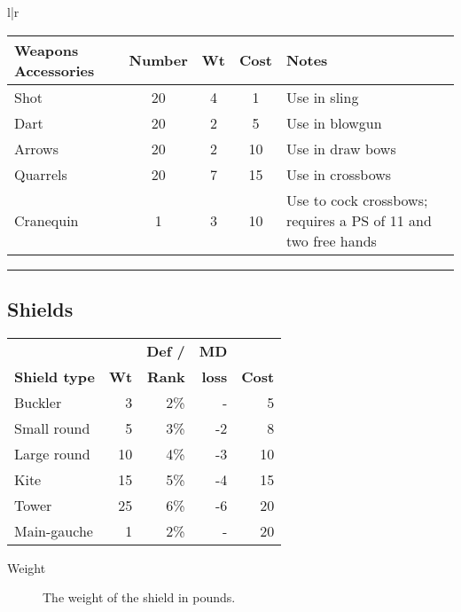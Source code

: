 \newpage

\begin{tabular}[t]{l|r}
\begin{minipage}[t]{4.6in}
\renewcommand{\thefootnote}{\Alph{footnote}}
\begin{tabularx}{\linewidth}[t]{lcccX}
\textbf{Weapons Accessories}\footnotemark & \tiny\textbf{Number} &
\tiny\textbf{Wt} & \tiny\textbf{Cost} & \tiny\textbf{Notes} \\ \hline
Shot		& 20 & 4 & 1 & Use in sling \\ \hline
Dart		& 20 & 2 & 5 & Use in blowgun \\ \hline
Arrows		& 20 & 2 & 10 & Use in draw bows \\ \hline
Quarrels	& 20 & 7 & 15 & Use in crossbows \\ \hline
Cranequin	& 1 & 3 & 10 & Use to cock crossbows; requires a PS of
11 and two free hands \\
\end{tabularx}

\smallskip

\rule[2.0mm]{\linewidth}{1.0mm}

\subsection{Shields}
\label{tables:shields}

\begin{tabularx}{\linewidth}{Xrrrr}
	 	&	& \textbf{Def /} & \textbf{MD} &  \\
\textbf{Shield type} & \textbf{Wt} & \textbf{Rank} &
\textbf{loss} & \textbf{Cost} \\ \hline
Buckler		& 3	& 2\%	& -	& 5 \\ \hline
Small round	& 5	& 3\%	& -2	& 8 \\ \hline
Large round	& 10	& 4\%	& -3	& 10 \\ \hline
Kite		& 15	& 5\%	& -4	& 15 \\ \hline
Tower		& 25	& 6\%	& -6	& 20 \\ \hline
Main-gauche\dag	& 1	& 2\%	& -	& 20 \\ \hline
\end{tabularx}

\smallskip

\begin{multicols}{2}
{\setlength\leftmargini{0pt}
\begin{description}
\item[Weight] The weight of the shield in pounds.


\end{description}}
\end{multicols}
\end{minipage}
\end{tabular}

